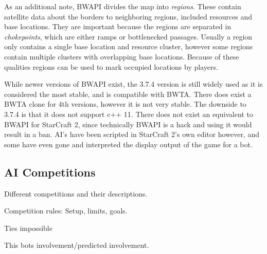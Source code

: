 	As an additional note, BWAPI divides the map into \emph{regions}. These contain satellite data about the borders to neighboring regions, included resources and base locations. They are important because the regions are separated in \emph{chokepoints}, which are either ramps or bottlenecked passages. Usually a region only contains a single base location and resource cluster, however some regions contain multiple clusters with overlapping base locations. Because of these qualities regions can be used to mark occupied locations by players.
	
	While newer versions of BWAPI exist, the 3.7.4 version is still widely used as it is considered the most stable, and is compatible with BWTA. There does exist a BWTA clone for 4th versions, however it is not very stable. The downside to 3.7.4 is that it does not support c++ 11. There does not exist an equivalent to BWAPI for StarCraft 2, since technically BWAPI is a hack and using it would result in a ban. AI's have been scripted in StarCraft 2's own editor however, and some have even gone and interpreted the display output of the game for a bot.

	\subsection*{AI Competitions}
	Different competitions and their descriptions.
	
	Competition rules: Setup, limits, goals.
	
	Ties impossible
	
	This bots involvement/predicted involvement.